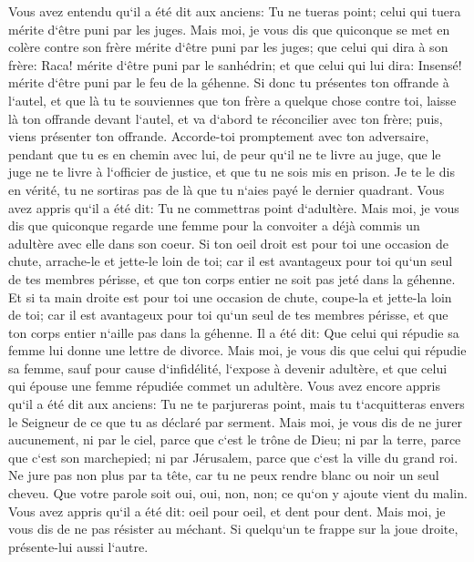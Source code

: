 \verse Vous avez entendu qu`il a été dit aux anciens: Tu ne tueras point; celui qui tuera mérite d`être puni par les juges. 
\verse Mais moi, je vous dis que quiconque se met en colère contre son frère mérite d`être puni par les juges; que celui qui dira à son frère: Raca! mérite d`être puni par le sanhédrin; et que celui qui lui dira: Insensé! mérite d`être puni par le feu de la géhenne. 
\verse Si donc tu présentes ton offrande à l`autel, et que là tu te souviennes que ton frère a quelque chose contre toi, 
\verse laisse là ton offrande devant l`autel, et va d`abord te réconcilier avec ton frère; puis, viens présenter ton offrande. 
\verse Accorde-toi promptement avec ton adversaire, pendant que tu es en chemin avec lui, de peur qu`il ne te livre au juge, que le juge ne te livre à l`officier de justice, et que tu ne sois mis en prison. 
\verse Je te le dis en vérité, tu ne sortiras pas de là que tu n`aies payé le dernier quadrant. 
\verse Vous avez appris qu`il a été dit: Tu ne commettras point d`adultère. 
\verse Mais moi, je vous dis que quiconque regarde une femme pour la convoiter a déjà commis un adultère avec elle dans son coeur. 
\verse Si ton oeil droit est pour toi une occasion de chute, arrache-le et jette-le loin de toi; car il est avantageux pour toi qu`un seul de tes membres périsse, et que ton corps entier ne soit pas jeté dans la géhenne. 
\verse Et si ta main droite est pour toi une occasion de chute, coupe-la et jette-la loin de toi; car il est avantageux pour toi qu`un seul de tes membres périsse, et que ton corps entier n`aille pas dans la géhenne. 
\verse Il a été dit: Que celui qui répudie sa femme lui donne une lettre de divorce. 
\verse Mais moi, je vous dis que celui qui répudie sa femme, sauf pour cause d`infidélité, l`expose à devenir adultère, et que celui qui épouse une femme répudiée commet un adultère. 
\verse Vous avez encore appris qu`il a été dit aux anciens: Tu ne te parjureras point, mais tu t`acquitteras envers le Seigneur de ce que tu as déclaré par serment. 
\verse Mais moi, je vous dis de ne jurer aucunement, ni par le ciel, parce que c`est le trône de Dieu; 
\verse ni par la terre, parce que c`est son marchepied; ni par Jérusalem, parce que c`est la ville du grand roi. 
\verse Ne jure pas non plus par ta tête, car tu ne peux rendre blanc ou noir un seul cheveu. 
\verse Que votre parole soit oui, oui, non, non; ce qu`on y ajoute vient du malin. 
\verse Vous avez appris qu`il a été dit: oeil pour oeil, et dent pour dent. 
\verse Mais moi, je vous dis de ne pas résister au méchant. Si quelqu`un te frappe sur la joue droite, présente-lui aussi l`autre. 
